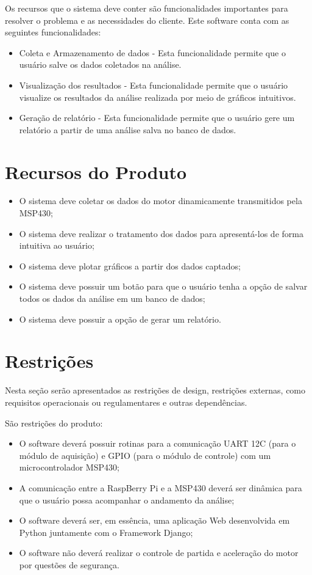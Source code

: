 \begin{anexosenv}
Os recursos que o sistema deve conter são funcionalidades importantes para resolver o problema e as necessidades do cliente. Este software conta com as seguintes funcionalidades:

\begin{itemize}
	\item Coleta e Armazenamento de dados - Esta funcionalidade permite que o usuário salve os dados coletados na análise.
	\item Visualização dos resultados - Esta funcionalidade permite que o usuário visualize os resultados da análise realizada por meio de gráficos intuitivos.
	\item Geração de relatório - Esta funcionalidade permite que o usuário gere um relatório a partir de uma análise salva no banco de dados.
\end{itemize}

\section{Recursos do Produto}

\begin{itemize}
	\item O sistema deve coletar os dados do motor dinamicamente transmitidos pela MSP430;
	\item O sistema deve realizar o tratamento dos dados para apresentá-los de forma intuitiva ao usuário;
	\item O sistema deve plotar gráficos a partir dos dados captados;
	\item O sistema deve possuir um botão para que o usuário tenha a opção de salvar todos os dados da análise em um banco de dados;
	\item O sistema deve possuir a opção de gerar um relatório.
\end{itemize}

\section{Restrições}

Nesta seção serão apresentados as restrições de design, restrições externas, como requisitos operacionais ou regulamentares e outras dependências.

São restrições do produto:

\begin{itemize}
	\item O software deverá possuir rotinas para a comunicação UART 12C (para o módulo de aquisição) e GPIO (para o módulo de controle) com um microcontrolador MSP430;
	\item A comunicação entre a RaspBerry Pi e a MSP430 deverá ser dinâmica para que o usuário possa acompanhar o andamento da análise;
	\item O software deverá ser, em essência, uma aplicação Web desenvolvida em Python juntamente com o Framework Django;
	\item O software não deverá realizar o controle de partida e aceleração do motor por questões de segurança.
\end{itemize}


\end{anexosenv}
